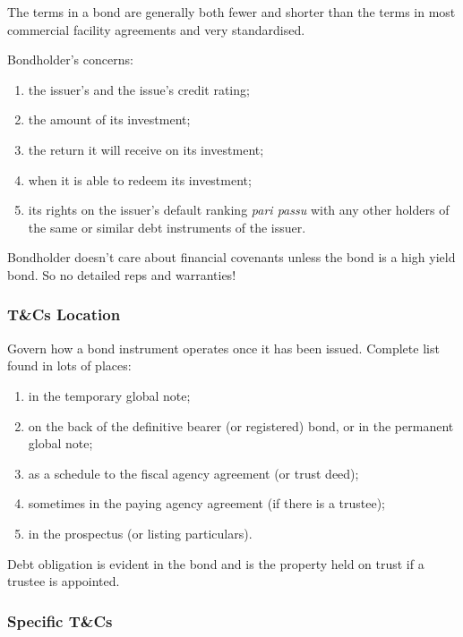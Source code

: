 \documentclass[
]{article}
\providecommand{\tightlist}{%
  \setlength{\itemsep}{0pt}\setlength{\parskip}{0pt}}
\begin{document}
The terms in a bond are generally both fewer and shorter than the terms
in most commercial facility agreements and very standardised.

Bondholder's concerns:

\begin{enumerate}
\tightlist
\item
  the issuer's and the issue's credit rating;
\item
  the amount of its investment;
\item
  the return it will receive on its investment;
\item
  when it is able to redeem its investment;
\item
  its rights on the issuer's default ranking \emph{pari passu} with any
  other holders of the same or similar debt instruments of the issuer.
\end{enumerate}

Bondholder doesn't care about financial covenants unless the bond is a
high yield bond. So no detailed reps and warranties!

\hypertarget{tcs-location}{%
\subsubsection{T\&Cs Location}\label{tcs-location}}

Govern how a bond instrument operates once it has been issued. Complete
list found in lots of places:

\begin{enumerate}
\tightlist
\item
  in the temporary global note;
\item
  on the back of the definitive bearer (or registered) bond, or in the
  permanent global note;
\item
  as a schedule to the fiscal agency agreement (or trust deed);
\item
  sometimes in the paying agency agreement (if there is a trustee);
\item
  in the prospectus (or listing particulars).
\end{enumerate}

Debt obligation is evident in the bond and is the property held on trust
if a trustee is appointed.

\hypertarget{specific-tcs}{%
\subsubsection{Specific T\&Cs}\label{specific-tcs}}
\end{document}
